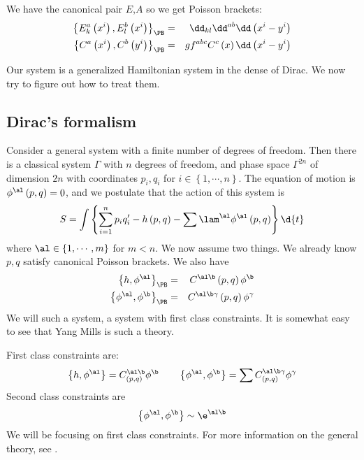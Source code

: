 \documentclass{booc}
\begin{document}
We have the canonical pair $E$,$A$ so we get Poisson brackets:
\begin{eqnarray}
\left\{ E^a_k \left( x^i \right) , E_l^b\left( x^i \right) \right\}_{\PB}
&=&  \dd_{kl} \dd^{ab} \dd\left( x^i - y^i \right)
\\
\left\{ C^a\left( x^i \right) , C^b\left( y^i \right) \right\}_{\PB} &=&
g f^{abc} C^c\left( x \right) \dd\left( x^i - y^i \right)
\end{eqnarray}

Our system is a generalized Hamiltonian system in the dense of Dirac.
We now try to figure out how to treat them.

\subsection{Dirac's formalism}

Consider a general system with a finite number of degrees of freedom.
Then there is a classical system $\Gamma$ with $n$ degrees of freedom,
and phase space $\Gamma^{2n}$ of dimension $2n$ with coordinates $p_i , q_i$
for $i\in \left\{ 1 , \cdots , n \right\}$. 
The equation of motion is $\phi^\al\left( p , q \right) = 0$,
and we postulate that the action of this system is
\begin{equation}
S = \int \left\{ \sum_{i = 1}^n
p_i q_i' - h\left( p , q \right)
- \sum \lam^\al \phi^\al \left( p , q \right) 
\right\}\d{t}
\end{equation}
where $\al\in \left\{ 1 , \cdots , m \right\}$ for $m < n$.
We now assume two things. 
We already know $p,q$ satisfy canonical Poisson brackets. 
We also have
\begin{eqnarray}
\left\{ h , \phi^\al \right\}_{\PB} &=&  
C^{\al \b} \left(  p ,q \right) \phi^\b
\\
\left\{ \phi^\al , \phi^\b \right\}_{\PB} &=& 
C^{\al \b \gamma} \left(  p , q \right) \phi^\gamma
\end{eqnarray}
We will such a system, a system with first class constraints. 
It is somewhat easy to see that Yang Mills is such a theory.

First class constraints are:
\begin{equation}
\left\{ h , \phi^\al \right\} = 
C^{\al\b}_{\left( p,q \right)}\phi^\b
\qquad
\left\{ \phi^\al , \phi^\b \right\} = 
\sum C^{\al \b \gamma}_{\left( p,q \right)} \phi^\gamma
\end{equation}
Second class constraints are
\begin{equation}
\left\{ \phi^\al , \phi^\b \right\} \sim \e^{\al \b}
\end{equation}
We will be focusing on first class constraints. 
For more information on the general theory, see \cite{teitelboim_quantization}.
\end{document}
